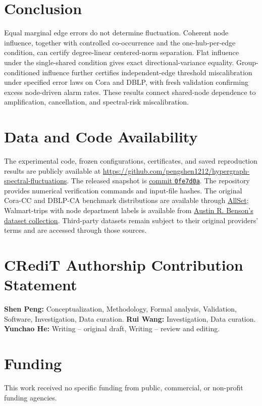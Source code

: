 \documentclass[preprint,11pt]{elsarticle}
\begin{document}
\section{Conclusion}\label{sec:conclusion}
Equal marginal edge errors do not determine fluctuation. Coherent
node influence, together with controlled co-occurrence and the
one-hub-per-edge condition, can certify degree-linear centered-norm
separation. Flat influence under the single-shared condition gives
exact directional-variance equality. Group-conditioned influence
further certifies independent-edge threshold miscalibration under
specified error laws on Cora and DBLP, with fresh validation confirming
excess node-driven alarm rates. These results connect shared-node
dependence to amplification, cancellation, and spectral-risk
miscalibration.

\section*{Data and Code Availability}
The experimental code, frozen configurations, certificates, and saved
reproduction results are publicly available at
\url{https://github.com/pengshen1212/hypergraph-spectral-fluctuations}.
The released snapshot is
\href{https://github.com/pengshen1212/hypergraph-spectral-fluctuations/tree/0fe7d0aecb326130c48b1b8879942551469f7b85}{commit \texttt{0fe7d0a}}.
The repository provides numerical verification commands and input-file
hashes. The original Cora-CC and DBLP-CA benchmark distributions are
available through \href{https://github.com/jianhao2016/AllSet}{AllSet};
Walmart-trips with node department labels is available from
\href{https://www.cs.cornell.edu/~arb/data/walmart-trips/}{Austin R. Benson's dataset collection}.
Third-party datasets remain subject to their original providers' terms
and are accessed through those sources.

\section*{CRediT Authorship Contribution Statement}
\textbf{Shen Peng:} Conceptualization, Methodology, Formal analysis,
Validation, Software, Investigation, Data curation.
\textbf{Rui Wang:} Investigation, Data curation.
\textbf{Yunchao He:} Writing -- original draft, Writing -- review and editing.

\section*{Funding}
This work received no specific funding from public, commercial, or
non-profit funding agencies.
\end{document}
